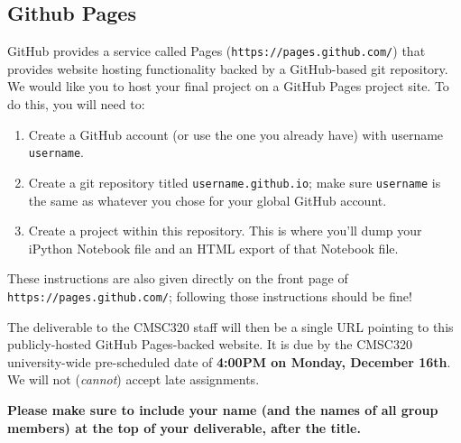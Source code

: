 \documentclass[11pt]{article}
\begin{document}
\subsection{Github Pages}
GitHub provides a service called Pages (\texttt{https://pages.github.com/}) that provides website hosting functionality backed by a GitHub-based git repository.  We would like you to host your final project on a GitHub Pages project site.  To do this, you will need to:
\begin{enumerate}
\item Create a GitHub account (or use the one you already have) with username \texttt{username}.
\item Create a git repository titled \texttt{username.github.io}; make sure \texttt{username} is the same as whatever you chose for your global GitHub account.
\item Create a project within this repository.  This is where you'll dump your iPython Notebook file and an HTML export of that Notebook file.  
\end{enumerate}
These instructions are also given directly on the front page of \texttt{https://pages.github.com/}; following those instructions should be fine!

The deliverable to the CMSC320 staff will then be a single URL pointing to this publicly-hosted GitHub Pages-backed website.  It is due by the CMSC320 university-wide pre-scheduled date of \textbf{4:00PM on Monday, December 16th}.  We will not (\emph{cannot}) accept late assignments.

\noindent\textbf{Please make sure to include your name (and the names of all group members) at the top of your deliverable, after the title.}
\end{document}
